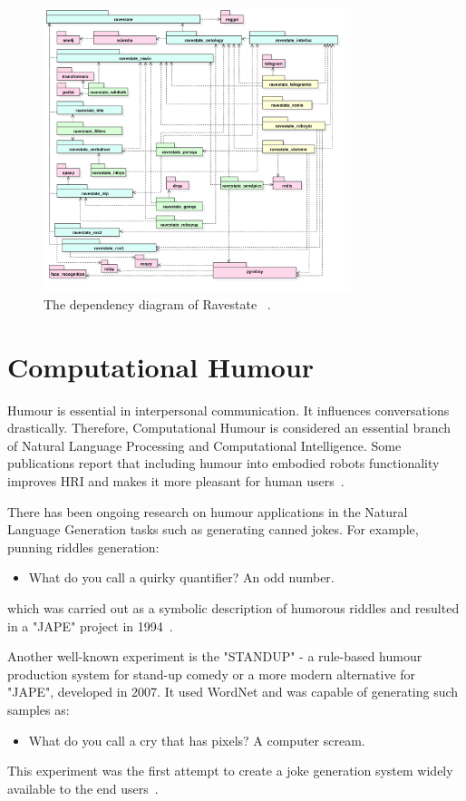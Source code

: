 \begin{figure}[htpb]
  \centering
  \includegraphics[width=0.8\textwidth]{figures/ravestate.png}
  \caption{The dependency diagram of Ravestate ~\parencite{ravestate}. } \label{fig:ravestate}
\end{figure}

\section{Computational Humour}

Humour is essential in interpersonal communication. It influences conversations drastically. Therefore, Computational Humour is considered an essential branch of Natural Language Processing and Computational Intelligence. Some publications report that including humour into embodied robots functionality improves HRI and makes it more pleasant for human users~\parencite{cb48d59358674187a9fccbc31a3bbd51}. 

There has been ongoing research on humour applications in the Natural Language Generation tasks such as generating canned jokes. For example, punning riddles generation:
\begin{itemize}
    \item What do you call a quirky quantifier? An odd number.
\end{itemize}
which was carried out as a symbolic description of humorous riddles and resulted in a "JAPE" project in 1994~\parencite{binsted1994symbolic}.

Another well-known experiment is the "STANDUP" - a rule-based humour production system for stand-up comedy or a more modern alternative for "JAPE", developed in 2007. It used WordNet and was capable of generating such samples as:
\begin{itemize}
    \item What do you call a cry that has pixels? A computer scream.
\end{itemize}
This experiment was the first attempt to create a joke generation system widely available to the end users~\parencite{3ae3f943de704b378c6f53fd1f0d358a}.

